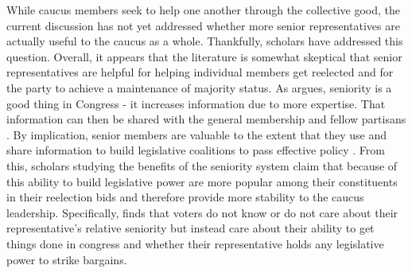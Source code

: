 \documentclass [12pt]{article}
\begin{document}
While caucus members seek to help one another through the collective good, the current discussion has not yet addressed whether more senior representatives are actually useful to the caucus as a whole. Thankfully, scholars have addressed this question. Overall, it appears that the literature is somewhat skeptical that senior representatives are helpful for helping individual members get reelected and for the party to achieve a maintenance of majority status. As  argues, seniority is a good thing in Congress - it increases information due to more expertise. That information can then be shared with the general membership and fellow partisans \cite{Krehbiel1991}. By implication, senior members are valuable to the extent that they use and share information to build legislative coalitions to pass effective policy \cite{Taylor2019}. From this, scholars studying the benefits of the seniority system claim that because of this ability to build legislative power are more popular among their constituents in their reelection bids and therefore provide more stability to the caucus leadership. Specifically,  finds that voters do not know or do not care about their representative's relative seniority but instead care about their ability to get things done in congress and whether their representative holds any legislative power to strike bargains. 
\end{document}
